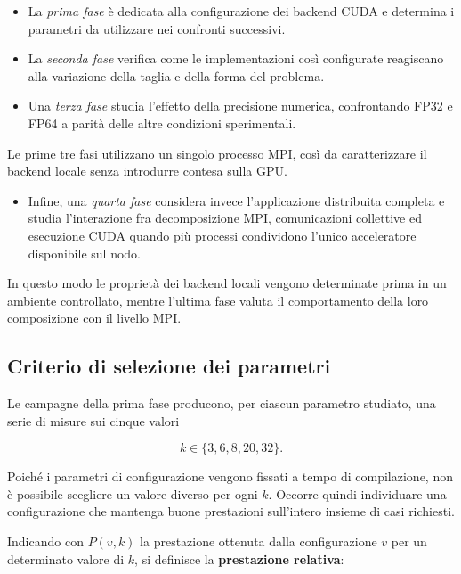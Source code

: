 \begin{itemize}
      \item La \emph{prima fase} è dedicata alla configurazione dei backend CUDA e determina
      i parametri da utilizzare nei confronti successivi.
      \item La \emph{seconda fase} verifica
      come le implementazioni così configurate reagiscano alla variazione della
      taglia e della forma del problema.
      \item Una \emph{terza fase} studia l'effetto della
      precisione numerica, confrontando FP32 e FP64 a parità delle altre
      condizioni sperimentali.
\end{itemize}

Le prime tre fasi utilizzano un singolo processo MPI, così da caratterizzare
il backend locale senza introdurre contesa sulla GPU.


\begin{itemize}
      \item Infine, una \emph{quarta fase}
      considera invece l'applicazione distribuita completa e studia
      l'interazione fra decomposizione MPI, comunicazioni collettive ed
      esecuzione CUDA quando più processi condividono l'unico acceleratore
      disponibile sul nodo.
\end{itemize}

In questo modo le proprietà dei backend locali vengono determinate prima
in un ambiente controllato, mentre l'ultima fase valuta il comportamento
della loro composizione con il livello MPI.

\subsection{Criterio di selezione dei parametri}\label{sec:criterio-robustezza}

Le campagne della prima fase producono, per ciascun parametro studiato,
una serie di misure sui cinque valori

\[
k \in \{3,6,8,20,32\}.
\]

Poiché i parametri di configurazione vengono fissati a tempo di
compilazione, non è possibile scegliere un valore diverso per ogni $k$.
Occorre quindi individuare una configurazione che mantenga buone
prestazioni sull'intero insieme di casi richiesti.

Indicando con $P(v,k)$ la prestazione ottenuta dalla configurazione $v$
per un determinato valore di $k$, si definisce la \textbf{prestazione relativa}:


